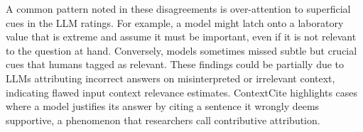 \documentclass[fleqn,10pt]{wlscirep}
\begin{document}
A common pattern noted in these disagreements is over-attention to superficial cues in the LLM ratings. For example, a model might latch onto a laboratory value that is extreme and assume it must be important, even if it is not relevant to the question at hand. %
Conversely, models sometimes missed subtle but crucial cues that humans tagged as relevant. %
These findings could be partially due to LLMs attributing incorrect answers on misinterpreted or irrelevant context, indicating flawed input context relevance estimates. ContextCite highlights cases where a model justifies its answer by citing a sentence it wrongly deems supportive, a phenomenon that researchers call contributive attribution. %

\end{document}
